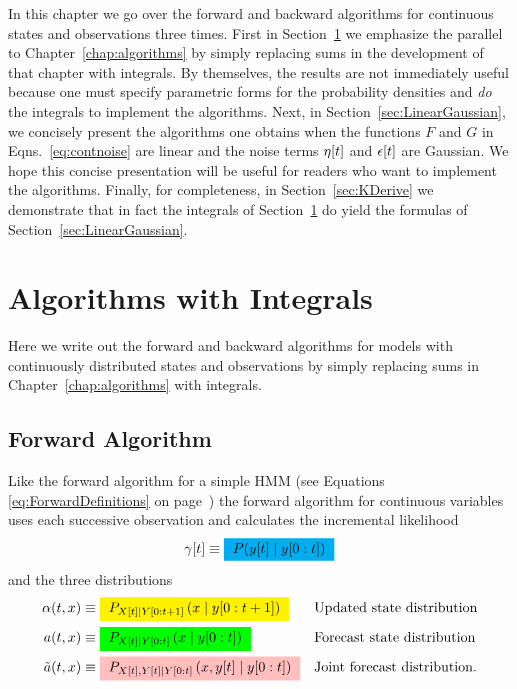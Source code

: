 In this chapter we go over the forward and backward algorithms for
continuous states and observations three times.  First in
Section~\ref{sec:integrals} we emphasize the parallel to
Chapter~\ref{chap:algorithms} by simply replacing sums in the
development of that chapter with integrals.  By themselves, the
results are not immediately useful because one must specify parametric
forms for the probability densities and \emph{do} the integrals to
implement the algorithms.  Next, in Section~\ref{sec:LinearGaussian},
we concisely present the algorithms one obtains when the functions $F$
and $G$ in Eqns.~\eqref{eq:contnoise} are linear and the noise terms
${\eta}{[t]}$ and ${\epsilon}{[t]}$ are Gaussian.  We hope this
concise presentation will be useful for readers who want to implement
the algorithms.  Finally, for completeness, in
Section~\ref{sec:KDerive} we demonstrate that in fact the integrals of
Section~\ref{sec:integrals} do yield the formulas of
Section~\ref{sec:LinearGaussian}.

\section{Algorithms with Integrals}
\label{sec:integrals}

Here we write out the forward and backward algorithms for models with
continuously distributed states and observations by simply replacing
sums in Chapter~\ref{chap:algorithms} with integrals.

\subsection{Forward Algorithm}

Like the forward algorithm for a simple HMM (see Equations
\eqref{eq:ForwardDefinitions} on page~\pageref{eq:ForwardDefinitions})
the forward algorithm for continuous variables uses each successive
observation and calculates the incremental likelihood
\begin{equation*}
  \ti{\gamma}{t} \equiv \gammax
\end{equation*}
and the three distributions
\begin{align*}
  \alpha(t,x) &\equiv \alphax{X}{t}{t+1}{x} && \text{Updated state
                                               distribution} \\
  a(t,x) &\equiv \StateForecast{X}{x}{t} && \text{Forecast state
                                            distribution} \\
  \tilde a(t,x) &\equiv \JointForecast{X}{x}{t} && \text{Joint
                                                   forecast
                                                   distribution}.
\end{align*}

